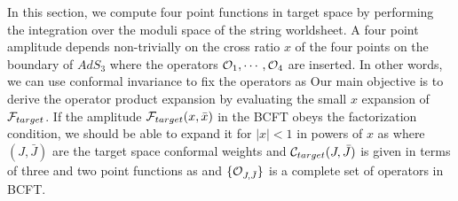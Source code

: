 In this section, we compute four point functions in
 target space by performing the integration over the
moduli space of the string worldsheet. A four point
amplitude depends non-trivially on the cross ratio $x$
of the four points on the boundary of $AdS_3$ where
the operators ${\cal O}_1, \cdots, {\cal O}_4$ are inserted.
In other words, we can use conformal
invariance to fix the operators as
\eqn{}
 Our
main objective is to derive the operator product
expansion by evaluating the small $x$ expansion of
${\cal F}_{target}$.
%
%
If the amplitude ${\cal F}_{target}(x,\bar x)$ in the BCFT
obeys the factorization condition,
we should be able to expand it for $|x| < 1$ in powers of
$x$ as
\eqn{}
where $(J, \bar J)$ are the target space conformal weights
and ${\cal C}_{target}(J , \bar J)$
is given in terms of three and two point functions as
\eqn{}
and $\{ {\cal O}_{J, \bar J} \}$ is a complete set of operators
in BCFT.

